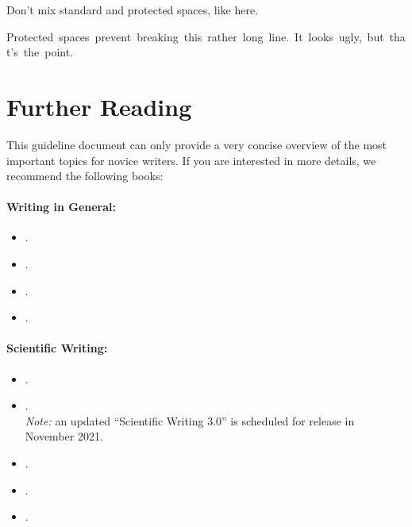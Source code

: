 \documentclass[11pt,a4paper]{article}
\begin{document}
\begin{itemize}
 
 
 \begin{goodexample}
   \begin{NoHyper}
     
   
    \end{NoHyper}
 \end{goodexample}
 \begin{badexample}
   \begin{NoHyper}
    Don't mix standard and protected spaces, like here\badstyle{\textvisiblespace\textvisiblespace}\cite{smith14}.

    {Protected~spaces~prevent~breaking~this~rather~long~line.~It~looks~ugly,~but~that's~the~point.}
   
   \end{NoHyper}
 \end{badexample}

\end{itemize}



\newpage
\vspace{1cm}
\section{Further Reading}
\label{sec-further-reading}
This guideline document can only provide a very concise overview of the most important topics for novice writers.
If you are interested in more details, we recommend the following books:
% 
\paragraph*{Writing in General:}
\begin{itemize}
  \item {}.
  \item {}.
  \item {}.
  \item {}.
\end{itemize}
% 
\paragraph*{Scientific Writing:}
\begin{itemize}
  \item {}.
  \item {}.\\\emph{Note:} an updated ``Scientific Writing 3.0'' is scheduled for release in November 2021.
  \item {}.
  \item {}.
  \item {}.
\end{itemize}
\end{document}
